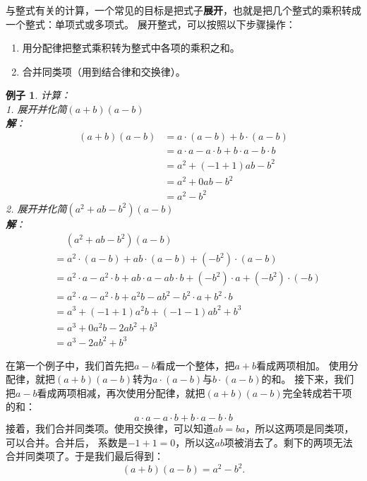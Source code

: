 \documentclass[12pt,UTF8]{ctexbook}
\newtheorem{ex}{例子}[section]
\begin{document}
与整式有关的计算，一个常见的目标是把式子\textbf{展开}，也就是把几个整式的乘积转成一个整式：单项式或多项式。
展开整式，可以按照以下步骤操作：
\begin{enumerate}
    \item 用分配律把整式乘积转为整式中各项的乘积之和。
    \item 合并同类项（用到结合律和交换律）。
\end{enumerate}
\begin{ex}\label{ex:5-0-0}
    计算：\\
    1. 展开并化简$(a + b)(a - b)$\\
    \textbf{解}：
    \begin{align*}
        (a + b)(a - b) &= a\cdot (a - b) + b\cdot (a - b) \tag{分配律展开} \\
        &= a\cdot a - a\cdot b + b\cdot a - b\cdot b \\
        &= a^2 + (-1 + 1)ab - b^2  \tag{合并同类项}\\
        &= a^2 + 0ab - b^2 \\
        &= a^2 - b^2 
    \end{align*}
    2. 展开并化简$(a^2 + ab - b^2)(a - b)$\\
    \textbf{解}：
    \begin{align*}
        &\quad\, (a^2 + ab - b^2)(a - b) \\
        &= a^2\cdot (a - b) + ab\cdot (a - b) + (- b^2)\cdot (a - b) \tag{分配律展开} \\
        &= a^2\cdot a - a^2\cdot b + ab\cdot a - ab\cdot b + (- b^2)\cdot a + (-b^2) \cdot (-b)  \\
        &= a^2\cdot a - a^2\cdot b + a^2b - ab^2 - b^2\cdot a + b^2 \cdot b  \\
        &= a^3 + (-1 + 1)a^2b + (-1 - 1)ab^2 + b^3 \tag{合并同类项}\\
        &= a^3 + 0a^2b - 2ab^2 + b^3 \\
        &= a^3 - 2ab^2 + b^3 
    \end{align*}
\end{ex}

在第一个例子中，我们首先把$a - b$看成一个整体，把$a + b$看成两项相加。
使用分配律，就把$(a + b)(a - b)$转为$a\cdot (a - b)$与$b\cdot (a - b)$的和。
接下来，我们把$a - b$看成两项相减，再次使用分配律，就把$(a + b)(a - b)$完全转成若干项的和：
$$ a\cdot a - a\cdot b + b\cdot a - b\cdot b$$
接着，我们合并同类项。使用交换律，可以知道$ab = ba$，所以这两项是同类项，可以合并。合并后，
系数是$-1 + 1 = 0$，所以这$ab$项被消去了。剩下的两项无法合并同类项了。于是我们最后得到：
$$(a + b)(a - b) = a^2 - b^2. $$
\end{document}
